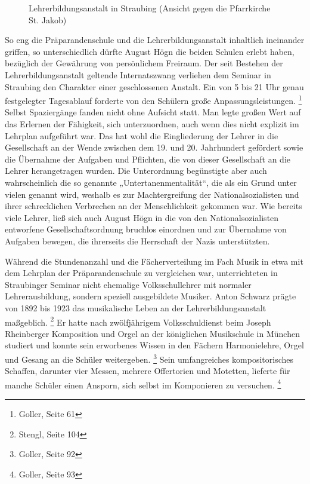 \begin{figure}
\caption{Lehrerbildungsanstalt in Straubing (Ansicht gegen die
Pfarrkirche St. Jakob)}
\end{figure}

So eng die Präparandenschule und die Lehrerbildungsanstalt inhaltlich
ineinander griffen, so unterschiedlich dürfte August Högn die beiden
Schulen erlebt haben, bezüglich der Gewährung von persönlichem
Freiraum. Der seit Bestehen der Lehrerbildungsanstalt geltende
Internatszwang verliehen dem Seminar in Straubing den Charakter einer
geschlossenen Anstalt. Ein von 5 bis 21 Uhr genau festgelegter
Tagesablauf forderte von den Schülern große
Anpassungsleistungen. \footnote{Goller, Seite 61} Selbst Spaziergänge
fanden nicht ohne Aufsicht statt. Man legte großen Wert auf das
Erlernen der Fähigkeit, sich unterzuordnen, auch wenn dies nicht
explizit im Lehrplan aufgeführt war. Das hat wohl die Eingliederung der
Lehrer in die Gesellschaft an der Wende zwischen dem 19. und 20.
Jahrhundert gefördert sowie die Übernahme der Aufgaben und Pflichten,
die von dieser Gesellschaft an die Lehrer herangetragen wurden. Die
Unterordnung begünstigte aber auch wahrscheinlich die so genannte
„Untertanenmentalität“, die als ein Grund unter vielen genannt wird,
weshalb es zur Machtergreifung der Nationalsozialisten und ihrer
schrecklichen Verbrechen an der Menschlichkeit gekommen war. Wie
bereits viele Lehrer, ließ sich auch August Högn in die von den
Nationalsozialisten entworfene Gesellschaftsordnung bruchlos einordnen
und zur Übernahme von Aufgaben bewegen, die ihrerseits die Herrschaft
der Nazis unterstützten.

Während die Stundenanzahl und die Fächerverteilung im Fach Musik in etwa
mit dem Lehrplan der Präparandenschule zu vergleichen war,
unterrichteten in Straubinger Seminar nicht ehemalige Volksschullehrer
mit normaler Lehrerausbildung, sondern speziell ausgebildete Musiker.
Anton Schwarz prägte von 1892 bis 1923 das musikalische Leben an der
Lehrerbildungsanstalt maßgeblich. \footnote{Stengl, Seite 104} Er hatte
nach zwölfjährigem Volksschuldienst beim Joseph Rheinberger Komposition
und Orgel an der königlichen Musikschule in München studiert und konnte
sein erworbenes Wissen in den Fächern Harmonielehre, Orgel und Gesang
an die Schüler weitergeben. \footnote{Goller, Seite 92} Sein
umfangreiches kompositorisches Schaffen, darunter vier Messen, mehrere
Offertorien und Motetten, lieferte für manche Schüler einen Ansporn,
sich selbst im Komponieren zu versuchen. \footnote{Goller, Seite 93}


